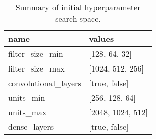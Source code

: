 \begin{table}
\caption{Summary of initial hyperparameter search space.}
\label{tab:hyperband_resnet_followup_params}
\centering

\begin{tabular}{ll}
\toprule
name & values \\
\midrule
filter\_size\_min & [128, 64, 32] \\
filter\_size\_max & [1024, 512, 256] \\
convolutional\_layers & [true, false] \\
units\_min & [256, 128, 64] \\
units\_max & [2048, 1024, 512] \\
dense\_layers & [true, false] \\
\bottomrule
\end{tabular}
\end{table}
